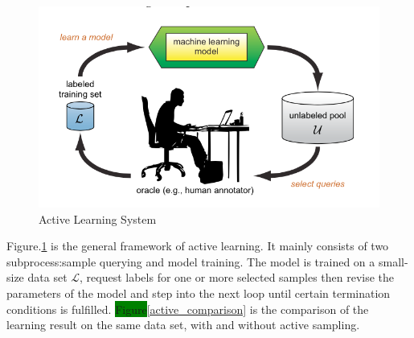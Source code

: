 \begin{figure}[htbp] 
\centering
\includegraphics[scale=0.4 ]{activelearning}
\caption{Active Learning System}\label{active_figure}
\end{figure}
Figure.\ref{active_figure} is the general framework of active learning. It mainly consists of two subprocess:sample querying and model training. The model is trained on a small-size data set $\mathcal{L}$, request labels for one or more selected samples then revise the parameters of the model and step into the next loop until certain termination conditions is fulfilled. \colorbox{green}{Figure}\ref{active_comparison}\cite{Settles2010} is the comparison of the learning result on the same data set, with and without active sampling.
